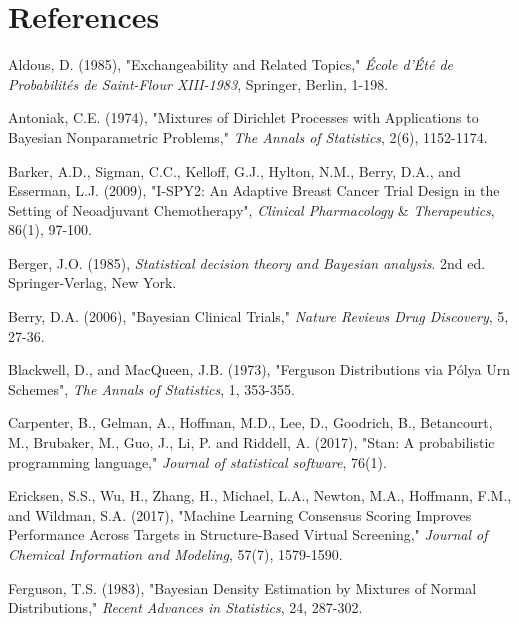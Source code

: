 \documentclass[12pt]{article}
\begin{document}
\section*{References}

\begin{list}{}{}
\item Aldous, D. (1985), "Exchangeability and Related Topics," {\em \'{E}cole d'\'{E}t\'{e} de Probabilit\'{e}s de Saint-Flour XIII-1983}, Springer, Berlin, 1-198.

\item Antoniak, C.E. (1974), "Mixtures of Dirichlet Processes with Applications to Bayesian Nonparametric Problems," {\em The Annals of Statistics}, 2(6), 1152-1174.

\item Barker, A.D., Sigman, C.C., Kelloff, G.J., Hylton, N.M., Berry, D.A., and Esserman, L.J. (2009), "I-SPY2: An Adaptive Breast Cancer Trial Design in the Setting of Neoadjuvant Chemotherapy", {\em Clinical Pharmacology} \& {\em Therapeutics}, 86(1), 97-100. 

\item Berger, J.O. (1985), {\em Statistical decision theory and Bayesian analysis}. 2nd ed. Springer-Verlag, New York.

\item Berry, D.A. (2006), "Bayesian Clinical Trials," {\em Nature Reviews Drug Discovery}, 5, 27-36.

\item Blackwell, D., and MacQueen, J.B. (1973), "Ferguson Distributions via P\'{o}lya Urn Schemes", {\em The Annals of Statistics}, 1, 353-355.

\item Carpenter, B., Gelman, A., Hoffman, M.D., Lee, D., Goodrich, B., Betancourt, M., Brubaker, M., Guo, J., Li, P. and Riddell, A. (2017), "Stan: A probabilistic programming language," {\em Journal of statistical software}, 76(1).

\item Ericksen, S.S., Wu, H., Zhang, H., Michael, L.A., Newton, M.A., Hoffmann, F.M., and Wildman, S.A. (2017), "Machine Learning Consensus Scoring Improves Performance Across Targets in Structure-Based Virtual Screening," {\em Journal of Chemical Information and Modeling}, 57(7), 1579-1590.

\item Ferguson, T.S. (1983), "Bayesian Density Estimation by Mixtures of Normal Distributions," {\em Recent Advances in Statistics}, 24, 287-302.


\end{list}
\end{document}
